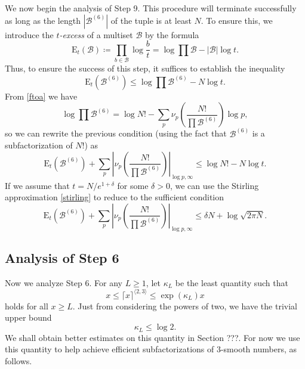 \documentclass[12pt,a4paper,reqno]{amsart}
\numberwithin{equation}{section}
\theoremstyle{plain}
\theoremstyle{definition}
\newcommand\tuple{{\mathcal B}}
\newcommand\excess{{\mathrm{E}}}
\begin{document}
We now begin the analysis of Step 9.  This procedure will terminate successfully as long as the length $|\tuple^{(6)}|$ of the tuple is at least $N$.  To ensure this, we introduce the \emph{$t$-excess} of a multiset $\tuple$ by the formula
$$
\excess_t(\tuple) \coloneqq \prod_{b \in \tuple} \log \frac{b}{t} = \log \prod \tuple - |\tuple| \log t.$$
Thus, to ensure the success of this step, it suffices to establish the inequality
$$
\excess_t(\tuple^{(6)}) \leq \log \prod \tuple^{(6)} - N \log t.$$
From \eqref{ftoa} we have
$$ \log \prod \tuple^{(6)} = \log N! - \sum_p \nu_p\left(\frac{N!}{\prod \tuple^{(6)}}\right) \log p,$$
so we can rewrite the previous condition (using the fact that $\tuple^{(6)}$ is a subfactorization of $N!$) as
$$
\excess_t(\tuple^{(6)}) + \sum_p \left| \nu_p\left(\frac{N!}{\prod \tuple^{(6)}}\right) \right|_{\log p,\infty}
\leq \log N! - N \log t.$$
If we assume that $t = N/e^{1+\delta}$ for some $\delta > 0$, we can use the Stirling approximation \eqref{stirling} to reduce to the sufficient condition
\begin{equation}\label{step7-cond}
\excess_t(\tuple^{(6)}) + \sum_p \left| \nu_p\left(\frac{N!}{\prod \tuple^{(6)}}\right) \right|_{\log p,\infty}
\leq \delta N + \log \sqrt{2\pi N}.
\end{equation}

\subsection{Analysis of Step 6}

Now we analyze Step 6. For any $L \geq 1$, let $\kappa_L$ be the least quantity such that
\begin{equation}\label{kappa-def}  
  x \leq \lceil x \rceil^{\langle 2,3\rangle} \leq \exp(\kappa_L) x 
\end{equation}
holds for all $x \geq L$. Just from considering the powers of two, we have the trivial upper bound
\begin{equation}\label{kl-triv}
  \kappa_L \leq \log 2.
\end{equation}
We shall obtain better estimates on this quantity in Section ???. For now we use this quantity to help achieve efficient subfactorizations of $3$-smooth numbers, as follows.
\end{document}
